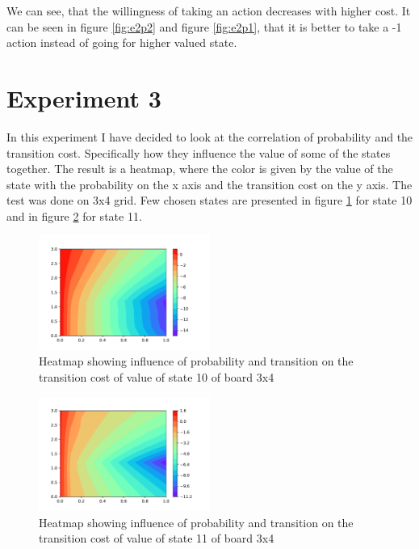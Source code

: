 \documentclass[10pt,journal,compsoc,twoside]{IEEEtran}
\begin{document}
We can see, that the willingness of taking an action decreases with higher cost. It can be seen in figure \ref{fig:e2p2} and figure \ref{fig:e2p1}, that it is better to
take a -1 action instead of going for higher valued state.



\section*{Experiment 3}\label{sec:experiment3}
In this experiment I have decided to look at the correlation of probability and the transition cost. Specifically how they influence the value of some of the states together.
The result is a heatmap, where the color is given by the value of the state with the probability on the x axis and the transition cost on the y axis. The test was done on 3x4 grid.
Few chosen states are presented in figure \ref{fig:e3_1} for state 10 and in figure \ref{fig:e3_2} for state 11.

\begin{figure}
    \caption{Heatmap showing influence of probability and transition on the transition cost of value of state 10 of board 3x4}
    \label{fig:e3_1}
        \includegraphics[width=0.5\textwidth, angle=0]{figures/e3_1.pdf}
\end{figure}
\begin{figure}
    \caption{Heatmap showing influence of probability and transition on the transition cost of value of state 11 of board 3x4}
    \label{fig:e3_2}    
        \includegraphics[width=0.5\textwidth, angle=0]{figures/e3_2.pdf}
\end{figure}
\end{document}
